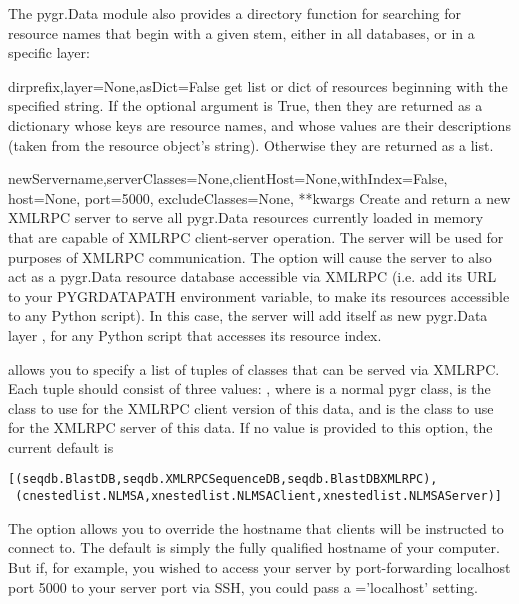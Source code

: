 \documentclass{howto}
\begin{document}
The pygr.Data module also provides a directory function for searching
for resource names that begin with a given stem, either in all
databases, or in a specific layer:
\begin{funcdesc}{dir}{prefix,layer=None,asDict=False}
  get list or dict of resources beginning with the specified string.
  If the optional  argument is True, then they are returned
  as a dictionary whose keys are resource names, and whose values are their
  descriptions (taken from the resource object's  string).
  Otherwise they are returned as a list.
\end{funcdesc}

\begin{funcdesc}{newServer}{name,serverClasses=None,clientHost=None,withIndex=False, host=None, port=5000, excludeClasses=None, **kwargs}
  Create and return a new XMLRPC server to serve all pygr.Data resources 
  currently loaded in memory that are capable of XMLRPC client-server
  operation.  The server  will be used for 
  purposes of XMLRPC communication.  The  option
  will cause the server to also act as a pygr.Data resource database
  accessible via XMLRPC (i.e. add its URL to your PYGRDATAPATH environment
  variable, to make its resources accessible to any Python script).
  In this case, the server will add itself as new pygr.Data layer
  , for any Python script that accesses its resource index.

   allows you to specify a list of tuples of
  classes that can be served via XMLRPC.  Each tuple should consist of
  three values: , where 
   is a normal pygr class,  is the 
  class to use for the XMLRPC client version of this data, and
   is the class to use for the XMLRPC server of
  this data.  If no value is provided to this option, the current
  default is 
\begin{verbatim}
[(seqdb.BlastDB,seqdb.XMLRPCSequenceDB,seqdb.BlastDBXMLRPC),
 (cnestedlist.NLMSA,xnestedlist.NLMSAClient,xnestedlist.NLMSAServer)] 
\end{verbatim}
  The  option allows you to override the hostname
  that clients will be instructed to connect to.  The default is simply
  the fully qualified hostname of your computer.  But if, for example,
  you wished to access your server by port-forwarding localhost port 5000
  to your server port via SSH, you could pass a ='localhost'
  setting.


\end{funcdesc}
\end{document}
